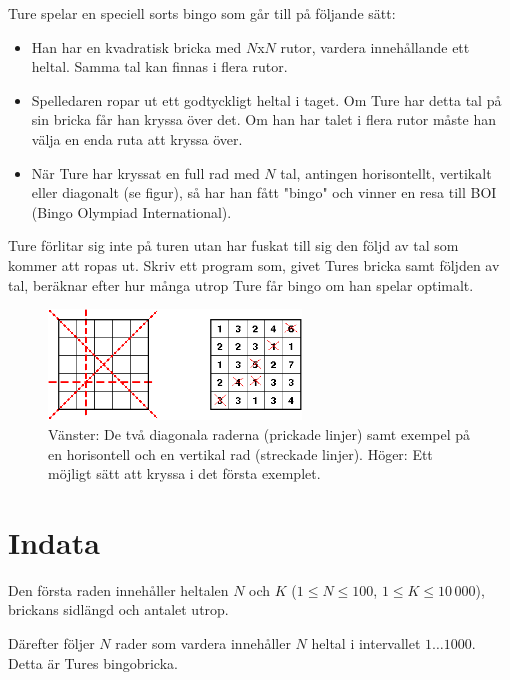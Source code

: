 
Ture spelar en speciell sorts bingo som går till på följande sätt:
\begin{itemize}
\item Han har en kvadratisk bricka med $N$x$N$ rutor, vardera innehållande ett heltal. Samma tal kan finnas i flera rutor.
\item Spelledaren ropar ut ett godtyckligt heltal i taget. Om Ture har detta tal på sin bricka får han kryssa över det. Om han har talet i flera rutor måste han välja en enda ruta att kryssa över.
\item När Ture har kryssat en full rad med $N$ tal, antingen horisontellt, vertikalt eller diagonalt (se figur), så har han fått "bingo" och vinner en resa till BOI (Bingo Olympiad International).
\end{itemize}

Ture förlitar sig inte på turen utan har fuskat till sig den följd av tal som kommer att ropas ut. Skriv ett program som, givet Tures bricka samt följden av tal, beräknar efter hur många utrop Ture får bingo om han spelar optimalt.

\begin{figure}[!h]
\begin{center}
\includegraphics[width=0.6\textwidth]{bingo.png}
\end{center}
\caption{Vänster: De två diagonala raderna (prickade linjer) samt
  exempel på en horisontell och en vertikal rad (streckade
  linjer). Höger: Ett möjligt sätt att kryssa i det första exemplet.}
\end{figure}



\section*{Indata}
Den första raden innehåller heltalen $N$ och $K$ ($1\leq N \leq 100$, $1 \leq K \leq 10\,000$), brickans
sidlängd och antalet utrop.

Därefter följer $N$ rader som vardera innehåller $N$ heltal i intervallet $1 \ldots 1000$. Detta är Tures bingobricka.

